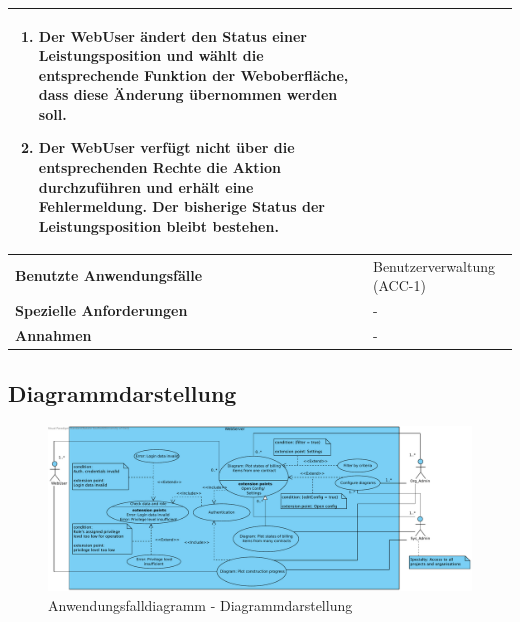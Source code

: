 \begin{longtable}[c]{|p{4cm}|p{10cm}|}
\begin{enumerate}
        \item Der WebUser \"andert den Status einer Leistungsposition und w\"ahlt die entsprechende Funktion der Weboberfl\"ache,  dass diese \"Anderung \"ubernommen werden soll.
        \item Der WebUser verf\"ugt nicht \"uber die entsprechenden Rechte die Aktion durchzuf\"uhren und erh\"alt eine Fehlermeldung. Der bisherige Status der Leistungsposition bleibt bestehen.
    \end{enumerate}                                                                                                    \\ \hline
    \textbf{Benutzte Anwendungsfälle} & Benutzerverwaltung (ACC-1)                                                                \\ \hline
    \textbf{Spezielle Anforderungen}  & -                                                                                         \\ \hline
    \textbf{Annahmen}                 & -                                                                                         \\ \hline
\end{longtable}

\clearpage

\subsection{Diagrammdarstellung}

\begin{figure}[h]
    \centering
    \includegraphics[width=\linewidth]{img/diagrams/diagramme_verwalten.pdf}
    \caption{Anwendungsfalldiagramm - Diagrammdarstellung}
    \label{fig:anwendungsfalldiagramm-dia-verwaltung}
\end{figure}

